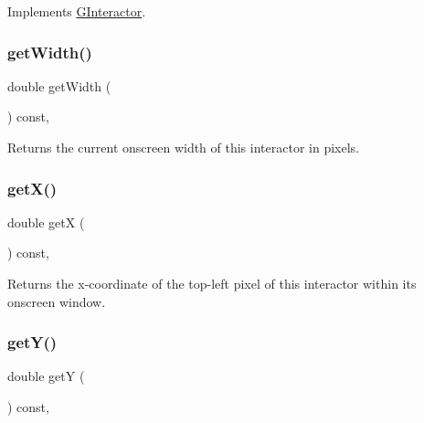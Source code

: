 Implements \mbox{\hyperlink{classGInteractor}{G\+Interactor}}.

\mbox{\label{classGInteractor_a0ed2965abd4f5701d2cadf71239faf19}} 
\subsubsection{\texorpdfstring{get\+Width()}{getWidth()}}
{\footnotesize\ttfamily double get\+Width (\begin{DoxyParamCaption}{ }\end{DoxyParamCaption}) const\hspace{0.3cm}{\ttfamily [virtual]}, {\ttfamily [inherited]}}



Returns the current onscreen width of this interactor in pixels. 

\mbox{\label{classGInteractor_a344385751bee0720059403940d57a13e}} 
\subsubsection{\texorpdfstring{get\+X()}{getX()}}
{\footnotesize\ttfamily double getX (\begin{DoxyParamCaption}{ }\end{DoxyParamCaption}) const\hspace{0.3cm}{\ttfamily [virtual]}, {\ttfamily [inherited]}}



Returns the x-\/coordinate of the top-\/left pixel of this interactor within its onscreen window. 

\mbox{\label{classGInteractor_aafa51c7f8f38a09febbb9ce7853f77b4}} 
\subsubsection{\texorpdfstring{get\+Y()}{getY()}}
{\footnotesize\ttfamily double getY (\begin{DoxyParamCaption}{ }\end{DoxyParamCaption}) const\hspace{0.3cm}{\ttfamily [virtual]}, {\ttfamily [inherited]}}



